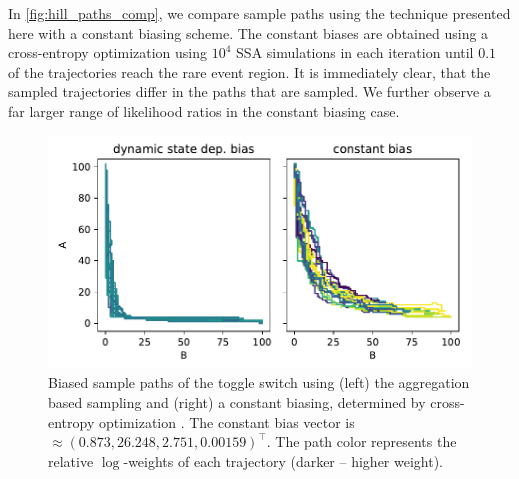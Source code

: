 In \autoref{fig:hill_paths_comp}, we compare sample paths using the technique presented here with a constant biasing scheme. 
The constant biases are obtained using a cross-entropy optimization using $10^4$ \ac{SSA} simulations in each iteration until $0.1$ of the trajectories reach the rare event region.
It is immediately clear, that the sampled trajectories differ in the paths that are sampled.
We further observe a far larger range of likelihood ratios in the constant biasing case.
\begin{figure}[htb]
    \centering
    \includegraphics[scale=.6]{gfx/hill_paths_comp.pdf}
    \caption[Comparison of biased sample paths]{\label{fig:hill_paths_comp}Biased sample paths of the toggle switch using (left) the aggregation based sampling and (right) a constant biasing, determined by cross-entropy optimization \parencite{daigle2011automated}. The constant bias vector is $\approx (0.873, 26.248, 2.751, 0.00159)^{\top}$. The path color represents the relative $\log$-weights of each trajectory (darker -- higher weight).}
\end{figure}

